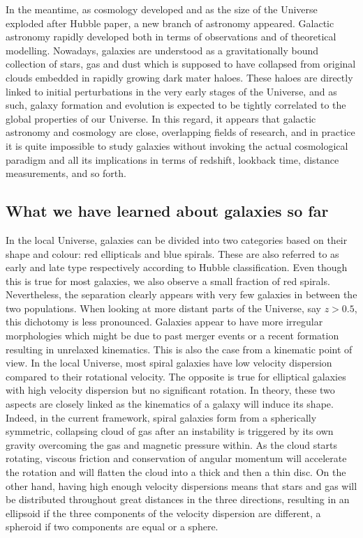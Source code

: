 In the meantime, as cosmology developed and as the size of the Universe exploded after Hubble paper, a new branch of astronomy appeared. Galactic astronomy rapidly developed both in terms of observations and of theoretical modelling. Nowadays, galaxies are understood as a gravitationally bound collection of stars, gas and dust which is supposed to have collapsed from original clouds embedded in rapidly growing dark mater haloes. These haloes are directly linked to initial perturbations in the very early stages of the Universe, and as such, galaxy formation and evolution is expected to be tightly correlated to the global properties of our Universe. In this regard, it appears that galactic astronomy and cosmology are close, overlapping fields of research, and in practice it is quite impossible to study galaxies without invoking the actual cosmological paradigm and all its implications in terms of redshift, lookback time, distance measurements, and so forth.

\subsection{What we have learned about galaxies so far}

In the local Universe, galaxies can be divided into two categories based on their shape and colour: red ellipticals and blue spirals. These are also referred to as early and late type respectively according to Hubble classification. Even though this is true for most galaxies, we also observe a small fraction of red spirals. Nevertheless, the separation clearly appears with very few galaxies in between the two populations. When looking at more distant parts of the Universe, say $z > 0.5$, this dichotomy is less pronounced. Galaxies appear to have more irregular morphologies which might be due to past merger events or a recent formation resulting in unrelaxed kinematics. This is also the case from a kinematic point of view. In the local Universe, most spiral galaxies have low velocity dispersion compared to their rotational velocity. The opposite is true for elliptical galaxies with high velocity dispersion but no significant rotation. In theory, these two aspects are closely linked as the kinematics of a galaxy will induce its shape. Indeed, in the current framework, spiral galaxies form from a spherically symmetric, collapsing cloud of gas after an instability is triggered by its own gravity overcoming the gas and magnetic pressure within. As the cloud starts rotating, viscous friction and conservation of angular momentum will accelerate the rotation and will flatten the cloud into a thick and then a thin disc. On the other hand, having high enough velocity dispersions means that stars and gas will be distributed throughout great distances in the three directions, resulting in an ellipsoid if the three components of the velocity dispersion are different, a spheroid if two components are equal or a sphere. \\

